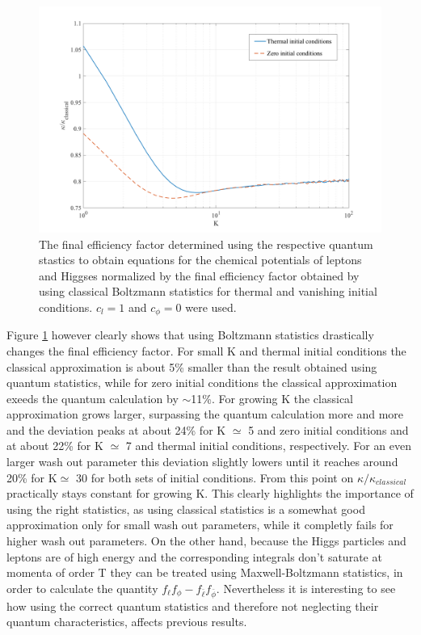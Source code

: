 \begin{figure}[H]
	\centering
	\includegraphics[width=\linewidth]{Images/quantum}
	\caption{The final efficiency factor determined using the respective quantum stastics to obtain equations for the chemical potentials of leptons and Higgses normalized by the final efficiency factor obtained by using classical Boltzmann statistics for thermal and vanishing initial conditions. $c_l=1$ and $c_\phi=0$ were used.}
	\label{fig:quantum}
\end{figure} \noindent
Figure \ref{fig:quantum} however clearly shows that using Boltzmann statistics drastically changes the final efficiency factor. For small K and thermal initial conditions the classical approximation is about 5\% smaller than the result obtained using quantum statistics, while for zero initial conditions the classical approximation exeeds the quantum calculation by $\sim$11\%. For growing K the classical approximation grows larger, surpassing the quantum calculation more and more and the deviation peaks at about 24\% for K $\simeq$ 5 and zero initial conditions and at about 22\% for K $\simeq$ 7 and thermal initial conditions, respectively. For an even larger wash out parameter this deviation slightly lowers until it reaches around 20\% for K$\simeq$ 30 for both sets of initial conditions. From this point on $\kappa/\kappa_{classical}$ practically stays constant for growing K.
This clearly highlights the importance of using the right statistics, as using classical statistics is a somewhat good approximation only for small wash out parameters, while it completly fails for higher wash out parameters.\newline \indent
On the other hand, because the Higgs particles and leptons are of high energy and the corresponding integrals don't saturate at momenta of order T they can be treated using Maxwell-Boltzmann statistics, in order to calculate the quantity $f_\ell f_\phi-f_{\bar{\ell}}f_{\bar{\phi}}$. Nevertheless it is interesting to see how using the correct quantum statistics and therefore not neglecting their quantum characteristics, affects previous results.
